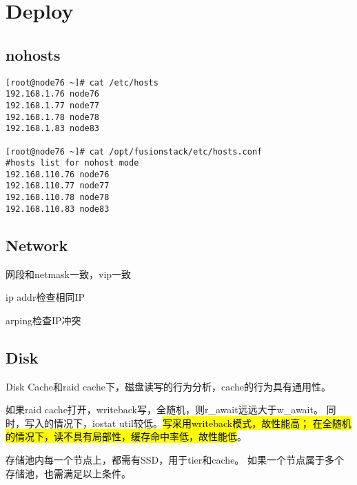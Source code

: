 \chapter{Deploy}

\section{nohosts}

\begin{lstlisting}[frame=single]
[root@node76 ~]# cat /etc/hosts
192.168.1.76 node76
192.168.1.77 node77
192.168.1.78 node78
192.168.1.83 node83

[root@node76 ~]# cat /opt/fusionstack/etc/hosts.conf 
#hosts list for nohost mode
192.168.110.76 node76
192.168.110.77 node77
192.168.110.78 node78
192.168.110.83 node83
\end{lstlisting}

\section{Network}

网段和netmask一致，vip一致

ip addr检查相同IP

arping检查IP冲突 

\section{Disk}

Disk Cache和raid cache下，磁盘读写的行为分析，cache的行为具有通用性。

如果raid cache打开，writeback写，全随机，则r\_await远远大于w\_await。
同时，写入的情况下，iostat util较低。\hl{写采用writeback模式，故性能高；
在全随机的情况下，读不具有局部性，缓存命中率低，故性能低}。

\begin{tcolorbox}
存储池内每一个节点上，都需有SSD，用于tier和cache。
如果一个节点属于多个存储池，也需满足以上条件。
\end{tcolorbox}
